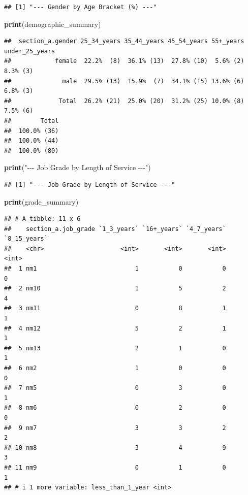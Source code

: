 \documentclass[
]{article}
\newenvironment{Shaded}{\begin{snugshade}}{\end{snugshade}}
\newcommand{\FunctionTok}[1]{\textcolor[rgb]{0.13,0.29,0.53}{\textbf{#1}}}
\newcommand{\NormalTok}[1]{#1}
\newcommand{\StringTok}[1]{\textcolor[rgb]{0.31,0.60,0.02}{#1}}
\begin{document}
\begin{verbatim}
## [1] "--- Gender by Age Bracket (%) ---"
\end{verbatim}

\begin{Shaded}
\begin{Highlighting}[]
\FunctionTok{print}\NormalTok{(demographic\_summary)}
\end{Highlighting}
\end{Shaded}

\begin{verbatim}
##  section_a.gender 25_34_years 35_44_years 45_54_years 55+_years under_25_years
##            female  22.2%  (8)  36.1% (13)  27.8% (10)  5.6% (2)       8.3% (3)
##              male  29.5% (13)  15.9%  (7)  34.1% (15) 13.6% (6)       6.8% (3)
##             Total  26.2% (21)  25.0% (20)  31.2% (25) 10.0% (8)       7.5% (6)
##        Total
##  100.0% (36)
##  100.0% (44)
##  100.0% (80)
\end{verbatim}

\begin{Shaded}
\begin{Highlighting}[]
\FunctionTok{print}\NormalTok{(}\StringTok{"{-}{-}{-} Job Grade by Length of Service {-}{-}{-}"}\NormalTok{)}
\end{Highlighting}
\end{Shaded}

\begin{verbatim}
## [1] "--- Job Grade by Length of Service ---"
\end{verbatim}

\begin{Shaded}
\begin{Highlighting}[]
\FunctionTok{print}\NormalTok{(grade\_summary)}
\end{Highlighting}
\end{Shaded}

\begin{verbatim}
## # A tibble: 11 x 6
##    section_a.job_grade `1_3_years` `16+_years` `4_7_years` `8_15_years`
##    <chr>                     <int>       <int>       <int>        <int>
##  1 nm1                           1           0           0            0
##  2 nm10                          1           5           2            4
##  3 nm11                          0           8           1            1
##  4 nm12                          5           2           1            1
##  5 nm13                          2           1           0            1
##  6 nm2                           1           0           0            0
##  7 nm5                           0           3           0            1
##  8 nm6                           0           2           0            0
##  9 nm7                           3           3           2            2
## 10 nm8                           3           4           9            3
## 11 nm9                           0           1           0            1
## # i 1 more variable: less_than_1_year <int>
\end{verbatim}
\end{document}
